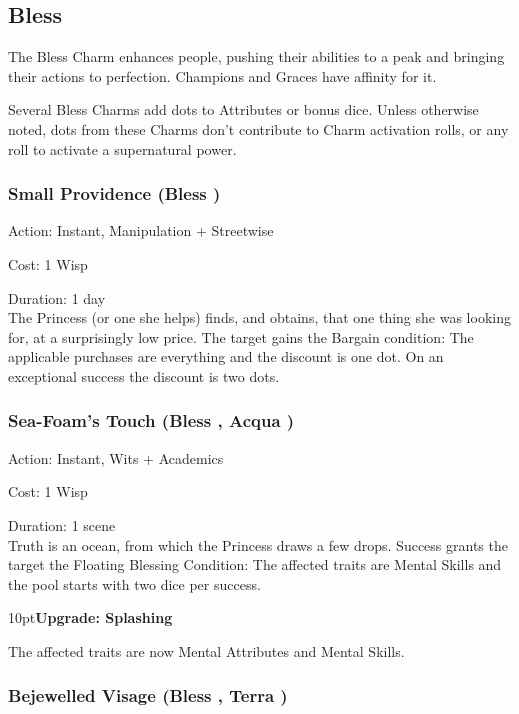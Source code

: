 \subsection*{Bless}
The Bless Charm enhances people, pushing their abilities to a peak and bringing their actions to perfection. Champions and Graces have affinity for it.

Several Bless Charms add dots to Attributes or bonus dice. Unless otherwise noted, dots from these Charms don't contribute to Charm activation rolls, or any roll to activate a supernatural power.

\subsubsection*{Small Providence (Bless \textbullet)}

\noindent Action: Instant, Manipulation + Streetwise

\noindent Cost: 1 Wisp

\noindent Duration: 1 day \\

\noindent The Princess (or one she helps) finds, and obtains, that one thing she was looking for, at a surprisingly low price. The target gains the Bargain condition: The applicable purchases are everything and the discount is one dot. On an exceptional success the discount is two dots.  

\subsubsection*{Sea-Foam's Touch (Bless \textbullet, Acqua \textbullet)}

\noindent Action: Instant, Wits + Academics

\noindent Cost: 1 Wisp

\noindent Duration: 1 scene \\

\noindent Truth is an ocean, from which the Princess draws a few drops. Success grants the target the Floating Blessing Condition: The affected traits are Mental Skills and the pool starts with two dice per success. 

\begin{myindentpar}{10pt}\textbf{Upgrade: Splashing}

The affected traits are now Mental Attributes and Mental Skills.\end{myindentpar}

\subsubsection*{Bejewelled Visage (Bless \textbullet, Terra \textbullet)}

